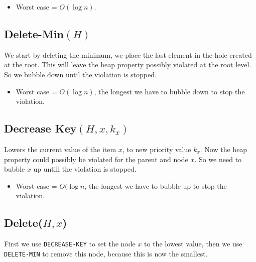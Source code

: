 \documentclass[a4paper,oneside,11pt]{article}
\begin{document}
\begin{itemize}
  \item{Worst case} = $O(\log n)$.
\end{itemize}

\subsection*{Delete-Min$(H)$}
We start by deleting the minimum, we place the last element in the hole created at the root. This will leave the heap property possibly violated at the root level. So we bubble down until the violation is stopped.

\begin{itemize}
  \item{Worst case} = $O(\log n)$, the longest we have to bubble down to stop the violation.
\end{itemize}
\subsection*{Decrease Key$(H, x, k_x)$}
Lowers the current value of the item $x$, to new priority value $k_x$. Now the heap property could possibly be violated for the parent and node $x$. So we need to bubble $x$ up untill the violation is stopped.

\begin{itemize}
  \item{Worst case} = $O(\log n$, the longest we have to bubble up to stop the violation.
\end{itemize}

\subsection*{Delete($H, x$)}
First we use \texttt{DECREASE-KEY} to set the node $x$ to the lowest value, then we use \texttt{DELETE-MIN} to remove this node, because this is now the smallest.
\end{document}
